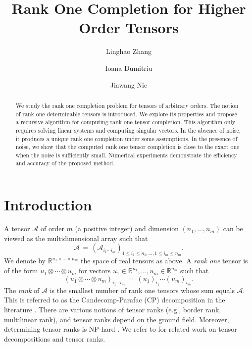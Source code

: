 \documentclass{amsart}
\newcommand{\re}{\mathbb{R}}
\newcommand{\mc}[1]{\mathcal{#1}}
\newcommand{\ddd}{,\ldots,}
\theoremstyle{definition}
\numberwithin{equation}{section}
\begin{document}
\title{Rank One Completion for Higher Order Tensors}

\author[Linghao~Zhang]{Linghao Zhang}
\author[Ioana~Dumitriu]{Ioana Dumitriu}
\author[Jiawang~Nie]{Jiawang Nie}

\address{Linghao Zhang, Ioana Dumitriu, Jiawang Nie,
Department of Mathematics, 
University of California San Diego,
9500 Gilman Drive, La Jolla, CA 92093, USA.}


\date{}




\begin{abstract}
We study the rank one completion problem for tensors of arbitrary orders.
The notion of rank one determinable tensors is introduced.
We explore its properties and propose a recursive algorithm for computing rank one tensor completion. 
This algorithm only requires solving linear systems and computing singular vectors.
In the absence of noise, it produces a unique rank one completion under some assumptions.
In the presence of noise, we show that the computed rank one tensor completion is close to the exact one
when the noise is sufficiently small.
Numerical experiments demonstrate the efficiency and accuracy of the proposed method.
\end{abstract}





\maketitle







\section{Introduction}
A tensor $\mc{A}$ of order $m$ (a positive integer) and dimension $(n_1 \ddd n_m)$ can be viewed as the multidimensional array such that
\[
\mc{A} \,=\, ( \mc{A}_{i_1 \cdots i_m} )_{1 \le i_1 \le n_1 \ddd 1 \le i_m \le n_m}.
\]
We denote by $\re^{n_1 \times \cdots \times n_m}$ the space of real tensors as above.
A {\it rank one} tensor is of the form
$u_1\otimes \cdots \otimes u_m $ for vectors $u_1 \in \re^{n_1}  \ddd u_m \in \re^{n_m}$ such that
\[
(u_1 \otimes \cdots \otimes u_m)_{i_1 \cdots i_m} \,=\, (u_1)_{i_1} \cdots (u_m)_{i_m}.
\]
The {\it rank} of $\mc{A}$ is the smallest number of rank one tensors whose sum equals $\mc{A}$.
This is referred to as the Candecomp-Parafac (CP) decomposition in the literature \cite{hitchcock1927,hitchcock1928,Lim13}. 
There are various notions of tensor ranks (e.g., border rank, multilinear rank),
and tensor ranks depend on the ground field.
Moreover, determining tensor ranks is NP-hard \cite{Hillar2013}.
We refer to \cite{LMV2000,harshman1970,hitchcock1927,hitchcock1928,Lim13,nieGP,nieSymApprox} for related work on tensor decompositions and tensor ranks.
\end{document}

